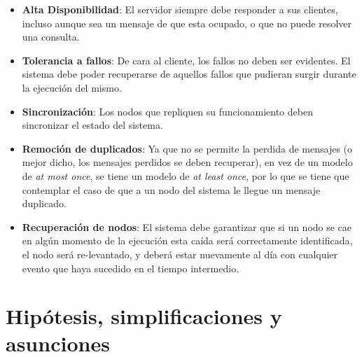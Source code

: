 \documentclass[titlepage,a4paper,oneside]{article}
\begin{document}
\begin{itemize}
\item \textbf{Alta Disponibilidad}: El servidor siempre debe responder a sus clientes, incluso aunque sea un mensaje de que esta ocupado, o que no puede resolver una consulta.
\item \textbf{Tolerancia a fallos}: De cara al cliente, los fallos no deben ser evidentes. El sistema debe poder recuperarse de aquellos fallos que pudieran surgir durante la ejecución del mismo.
\item \textbf{Sincronización}: Los nodos que repliquen su funcionamiento deben sincronizar el estado del sistema.
\item \textbf{Remoción de duplicados}: Ya que no se permite la perdida de mensajes (o mejor dicho, los mensajes perdidos se deben recuperar), en vez de un modelo de \textit{at most once}, se tiene un modelo de \textit{at least once}, por lo que se tiene que contemplar el caso de que a un nodo del sistema le llegue un mensaje duplicado.
\item \textbf{Recuperación de nodos}: El sistema debe garantizar que si un nodo se cae en algún momento de la ejecución esta caída será correctamente identificada, el nodo será re-levantado, y deberá estar nuevamente al día con cualquier evento que haya sucedido en el tiempo intermedio.
\end{itemize}

\section{Hipótesis, simplificaciones y asunciones}
\end{document}

